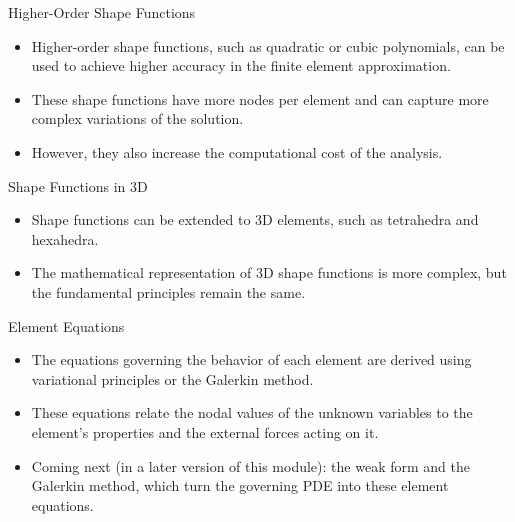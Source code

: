 \documentclass[aspectratio=169,11pt]{beamer}
\begin{document}
\begin{frame}{Higher-Order Shape Functions}
    \begin{itemize}
        \item Higher-order shape functions, such as quadratic or cubic polynomials, can be used to achieve higher accuracy in the finite element approximation.
        \item These shape functions have more nodes per element and can capture more complex variations of the solution.
        \item However, they also increase the computational cost of the analysis.
    \end{itemize}
\end{frame}

\begin{frame}{Shape Functions in 3D}
    \begin{itemize}
        \item Shape functions can be extended to 3D elements, such as tetrahedra and hexahedra.
        \item The mathematical representation of 3D shape functions is more complex, but the fundamental principles remain the same.
    \end{itemize}
\end{frame}

\begin{frame}{Element Equations}
    \begin{itemize}
        \item The equations governing the behavior of each element are derived using variational principles or the Galerkin method.
        \item These equations relate the nodal values of the unknown variables to the element's properties and the external forces acting on it.
        \item Coming next (in a later version of this module): the weak form and the Galerkin method, which turn the governing PDE into these element equations.
    \end{itemize}
\end{frame}
\end{document}
